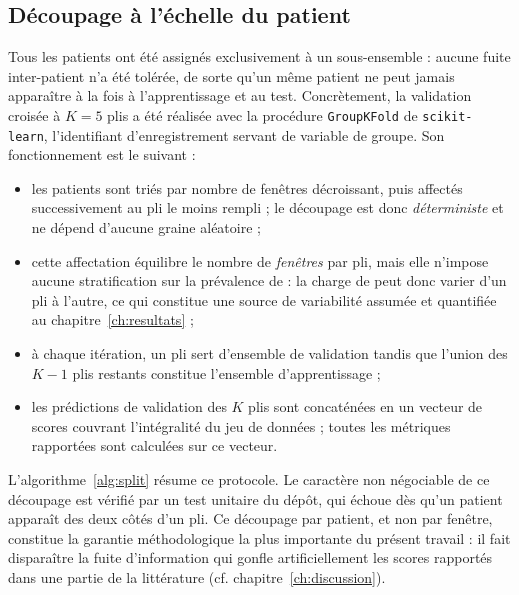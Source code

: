 \subsection{Découpage à l'échelle du patient}
\label{sec:meth:split}
Tous les patients ont été assignés exclusivement à un sous-ensemble : aucune fuite inter-patient n'a été tolérée, de sorte qu'un même patient ne peut jamais apparaître à la fois à l'apprentissage et au test. Concrètement, la validation croisée à \(K = 5\) plis a été réalisée avec la procédure \texttt{GroupKFold} de \texttt{scikit-learn}, l'identifiant d'enregistrement servant de variable de groupe. Son fonctionnement est le suivant :
\begin{itemize}[leftmargin=*]
  \item les patients sont triés par nombre de fenêtres décroissant, puis affectés successivement au pli le moins rempli ; le découpage est donc \emph{déterministe} et ne dépend d'aucune graine aléatoire ;
  \item cette affectation équilibre le nombre de \emph{fenêtres} par pli, mais elle n'impose aucune stratification sur la prévalence de \FA{} : la charge de \FA{} peut donc varier d'un pli à l'autre, ce qui constitue une source de variabilité assumée et quantifiée au chapitre~\ref{ch:resultats} ;
  \item à chaque itération, un pli sert d'ensemble de validation tandis que l'union des \(K-1\) plis restants constitue l'ensemble d'apprentissage ;
  \item les prédictions de validation des \(K\) plis sont concaténées en un vecteur de scores  couvrant l'intégralité du jeu de données ; toutes les métriques rapportées sont calculées sur ce vecteur.
\end{itemize}

L'algorithme~\ref{alg:split} résume ce protocole. Le caractère non négociable de ce découpage est vérifié par un test unitaire du dépôt, qui échoue dès qu'un patient apparaît des deux côtés d'un pli. Ce découpage par patient, et non par fenêtre, constitue la garantie méthodologique la plus importante du présent travail : il fait disparaître la fuite d'information qui gonfle artificiellement les scores rapportés dans une partie de la littérature (cf. chapitre~\ref{ch:discussion}).

